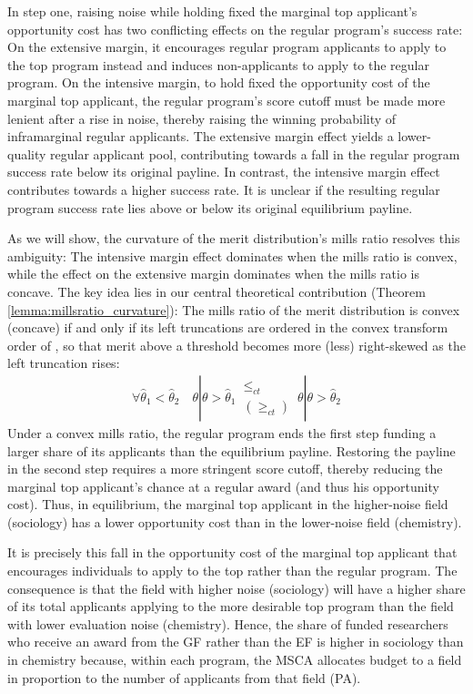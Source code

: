 \documentclass[12pt,reqno]{amsart}
\theoremstyle{definition}
\theoremstyle{plain} %
\begin{document}
\noindent In step one, raising noise while holding fixed the marginal top applicant's opportunity cost has two conflicting effects on the regular program's success rate: On the extensive margin, it encourages regular program applicants to apply to the top program instead and induces non-applicants to apply to the regular program. On the intensive margin, to hold fixed the opportunity cost of the marginal top applicant, the regular program's score cutoff must be made more lenient after a rise in noise, thereby raising the winning probability of inframarginal regular applicants. The extensive margin effect yields a lower-quality regular applicant pool, contributing towards a fall in the regular program success rate below its original payline. In contrast, the intensive margin effect contributes towards a higher success rate. It is unclear if the resulting regular program success rate lies above or below its original equilibrium payline. 

\noindent As we will show, the curvature of the merit distribution's mills ratio resolves this ambiguity: The intensive margin effect dominates when the mills ratio is convex, while the effect on the extensive margin dominates when the mills ratio is concave. The key idea lies in our central theoretical contribution (Theorem \ref{lemma:millsratio_curvature}): The mills ratio of the merit distribution is convex (concave) if and only if its left truncations are ordered in the convex transform order of \cite{vanzwet1964convex}, so that merit above a threshold becomes more (less) right-skewed as the left truncation rises:
\begin{align*}
    \forall \hat{\theta}_1<\hat{\theta}_2 \quad \theta|\theta>\hat{\theta}_1 \,\substack{\leq_{ct}\\ (\geq_{ct})}\,\theta|\theta>\hat{\theta}_2
\end{align*}
Under a convex mills ratio, the regular program ends the first step funding a larger share of its applicants than the equilibrium payline. Restoring the payline in the second step requires a more stringent score cutoff, thereby reducing the marginal top applicant's chance at a regular award (and thus his opportunity cost). Thus, in equilibrium, the marginal top applicant in the higher-noise field (sociology) has a lower opportunity cost than in the lower-noise field (chemistry). 

\noindent It is precisely this fall in the opportunity cost of the marginal top applicant that encourages individuals to apply to the top rather than the regular program. The consequence is that the field with higher noise (sociology) will have a higher share of its total applicants applying to the more desirable top program than the field with lower evaluation noise (chemistry). Hence, the share of funded researchers who receive an award from the GF rather than the EF is higher in sociology than in chemistry because, within each program, the MSCA allocates budget to a field in proportion to the number of applicants from that field (PA). 
\end{document}
